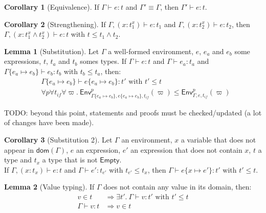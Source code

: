 \documentclass[a4paper]{article}%
\newcommand{\dom}[1]{\textsf{dom}(#1)}
\newcommand{\Empty} {\textsf{Empty}}%
\newcommand{\subst}[2]{\{#1 \mapsto #2\}}
\newcommand{\Gp}[2]{\textsf{Env}^{#1}_{#2}}
\theoremstyle{definition}
\newtheorem{lemma}{Lemma}
\newtheorem{corollary}{Corollary}
\begin{document}
        \begin{corollary}[Equivalence]
          If $\Gamma \vdash e:t$ and $\Gamma' \equiv \Gamma$, then $\Gamma' \vdash e:t$.
        \end{corollary}
    
        \begin{corollary}[Strengthening]
          If $\Gamma, (x:t_1^x) \vdash e:t_1$ and $\Gamma, (x:t_2^x) \vdash e:t_2$, then
          $\Gamma, (x:t_1^x\land t_2^x) \vdash e:t$ with $t \leq t_1\land t_2$.
        \end{corollary}
    
        \begin{lemma}[Substitution]
          Let $\Gamma$ a well-formed environment, $e$, $e_a$ and $e_b$ some expressions, $t$, $t_a$ and $t_b$ somes types.
          If $\Gamma \vdash e:t$ and $\Gamma \vdash e_a : t_a$ and $\Gamma\subst {e_a} {e_b} \vdash e_b:t_b$ with $t_b \leq t_a$, then:
          \begin{align*}
            &\Gamma \subst {e_a} {e_b} \vdash e \subst {e_a} {e_b}:t' \text{ with } t'\leq t\\
            &\forall p \forall t_{if} \forall \varpi.\ \Gp p {\Gamma\subst {e_a} {e_b},e\subst {e_a} {e_b},t_{if}} (\varpi) \leq \Gp p {\Gamma,e,t_{if}} (\varpi)
          \end{align*}
        \end{lemma}
    
        TODO: beyond this point, statements and proofs must be checked/updated (a lot of changes have been made).

        \begin{corollary}[Substitution 2]
          Let $\Gamma$ an environment, $x$ a variable that does not appear in $\dom \Gamma$, $e$ an expression, $e'$ an expression that does not contain $x$, $t$ a type and $t_x$ a type that is not $\Empty$.\\
          If $\Gamma, (x:t_x) \vdash e:t$ and $\Gamma \vdash e':t_{e'}$ with $t_{e'} \leq t_x$, then $\Gamma \vdash e \subst x {e'}:t'$ with $t'\leq t$.
        \end{corollary}
    
        \begin{lemma}[Value typing]
          If $\Gamma$ does not contain any value in its domain, then:
          \begin{align*}
            v \in t &\Rightarrow \exists t'.\ \Gamma \vdash v : t' \text{ with } t' \leq t\\
            \Gamma \vdash v : t &\Rightarrow v \in t
          \end{align*}
        \end{lemma}
    
\end{document}
